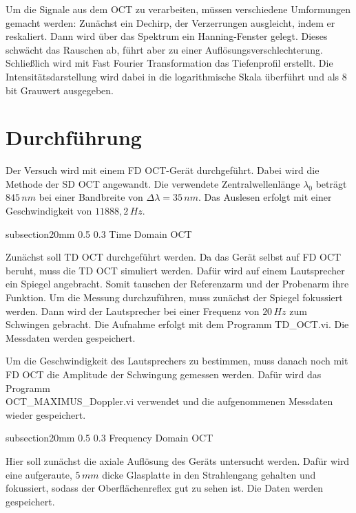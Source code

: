\documentclass[german, %
parskip=full, %
bibliography=totoc, %
]{scrartcl}
\makeatletter
\renewcommand\subsection{\@startsection 
   {subsection}{2}{0mm}%
   {0.5\baselineskip}%
   {0.3\baselineskip}%
   {\bfseries\sffamily\large}%
   }
\makeatother
\begin{document}
Um die Signale aus dem OCT zu verarbeiten, müssen verschiedene Umformungen gemacht werden: Zunächst ein Dechirp, der Verzerrungen ausgleicht, indem er reskaliert. Dann wird über das Spektrum ein Hanning-Fenster gelegt. Dieses schwächt das Rauschen ab, führt aber zu einer Auflösungsverschlechterung. Schließlich wird mit Fast Fourier Transformation das Tiefenprofil erstellt. Die Intensitätsdarstellung wird dabei in die logarithmische Skala überführt und als 8\,bit Grauwert ausgegeben.

\section{Durchführung}

Der Versuch wird mit einem FD OCT-Gerät durchgeführt. Dabei wird die Methode der SD OCT angewandt. Die verwendete Zentralwellenlänge $\lambda_0$ beträgt $845\,nm$ bei einer Bandbreite von $\Delta \lambda = 35\,nm$. Das Auslesen erfolgt mit einer Geschwindigkeit von $11888,2\,Hz$.

\subsection{Time Domain OCT}

Zunächst soll TD OCT durchgeführt werden. Da das Gerät selbst auf FD OCT beruht, muss die TD OCT simuliert werden. Dafür wird auf einem Lautsprecher ein Spiegel angebracht. Somit tauschen der Referenzarm und der Probenarm ihre Funktion. Um die Messung durchzuführen, muss zunächst der Spiegel fokussiert werden. Dann wird der Lautsprecher bei einer Frequenz von $20\,Hz$ zum Schwingen gebracht. Die Aufnahme erfolgt mit dem Programm TD\_OCT.vi. Die Messdaten werden gespeichert.

Um die Geschwindigkeit des Lautsprechers zu bestimmen, muss danach noch mit FD OCT die Amplitude der Schwingung gemessen werden. Dafür wird das Programm \\ OCT\_MAXIMUS\_Doppler.vi verwendet und die aufgenommenen Messdaten wieder gespeichert. 

\subsection{Frequency Domain OCT}

Hier soll zunächst die axiale Auflösung des Geräts untersucht werden. Dafür wird eine aufgeraute, $5\,mm$ dicke Glasplatte in den Strahlengang gehalten und fokussiert, sodass der Oberflächenreflex gut zu sehen ist. Die Daten werden gespeichert.
\end{document}
